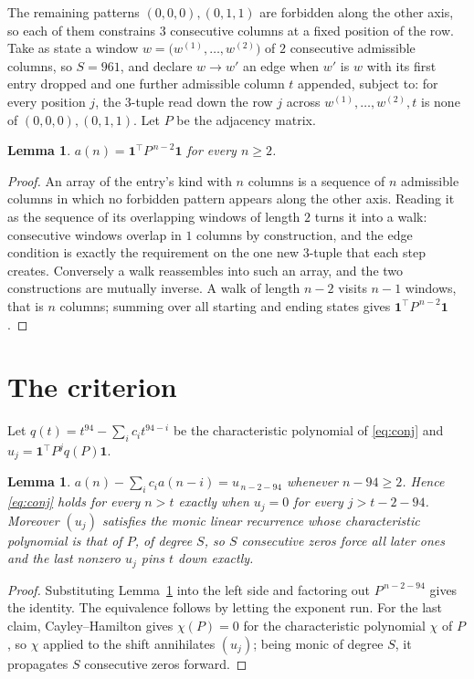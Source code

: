 \documentclass[11pt,a4paper]{article}
\theoremstyle{plain}
\newtheorem{lemma}[theorem]{Lemma}
\theoremstyle{definition}
\begin{document}
The remaining patterns $(0,0,0), (0,1,1)$ are forbidden along the other axis, so each of them
constrains $3$ consecutive columns at a fixed position of the row. Take as state a
window $w=\bigl(w^{(1)},\dots,w^{(2)}\bigr)$ of $2$ consecutive admissible
columns, so $S=961$, and declare $w\to w'$ an edge when $w'$ is $w$ with its first entry
dropped and one further admissible column $t$ appended, subject to: for every position
$j$, the $3$-tuple read down the row $j$ across $w^{(1)},\dots,w^{(2)},t$
is none of $(0,0,0), (0,1,1)$. Let $P$ be the adjacency matrix.

\begin{lemma}\label{lem:walk}
$a(n)=\mathbf{1}^{\!\top}P^{\,n-2}\mathbf{1}$ for every $n\ge2$.
\end{lemma}

\begin{proof}
An array of the entry's kind with $n$ columns is a sequence of $n$ admissible columns in
which no forbidden pattern appears along the other axis. Reading it as the sequence of its
overlapping windows of length $2$ turns it into a walk: consecutive windows overlap in
$1$ columns by construction, and the edge condition is exactly the requirement on the one
new $3$-tuple that each step creates. Conversely a walk reassembles into such an array,
and the two constructions are mutually inverse. A walk of length $n-2$ visits $n-1$
windows, that is $n$ columns; summing over all starting and ending states gives
$\mathbf{1}^{\!\top}P^{\,n-2}\mathbf{1}$.
\end{proof}

\section{The criterion}

Let $q(t)=t^{94}-\sum_i c_i t^{94-i}$ be the characteristic polynomial of
\eqref{eq:conj} and $u_j=\mathbf{1}^{\!\top}P^{j}q(P)\mathbf{1}$.

\begin{lemma}\label{lem:crit}
$a(n)-\sum_i c_i a(n-i)=u_{\,n-2-94}$ whenever $n-94\ge2$. Hence
\eqref{eq:conj} holds for every $n>t$ exactly when $u_j=0$ for every
$j>t-2-94$. Moreover $(u_j)$ satisfies the monic linear recurrence whose
characteristic polynomial is that of $P$, of degree $S$, so $S$ consecutive zeros force all
later ones and the last nonzero $u_j$ pins $t$ down exactly.
\end{lemma}

\begin{proof}
Substituting Lemma~\ref{lem:walk} into the left side and factoring out
$P^{\,n-2-94}$ gives the identity. The equivalence follows by letting the exponent
run. For the last claim, Cayley--Hamilton gives $\chi(P)=0$ for the characteristic
polynomial $\chi$ of $P$, so $\chi$ applied to the shift annihilates $(u_j)$; being monic of
degree $S$, it propagates $S$ consecutive zeros forward.
\end{proof}
\end{document}
